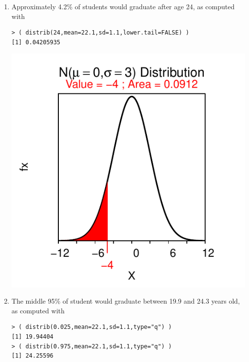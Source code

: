 \documentclass[10pt,openany]{book}\usepackage[]{graphicx}\usepackage[]{color}
\makeatletter
\newenvironment{kframe}{%
 \def\at@end@of@kframe{}%
 \ifinner\ifhmode%
  \def\at@end@of@kframe{\end{minipage}}%
  \begin{minipage}{\columnwidth}%
 \fi\fi%
 \def\FrameCommand##1{\hskip\@totalleftmargin \hskip-\fboxsep
 \colorbox{shadecolor}{##1}\hskip-\fboxsep
     \hskip-\linewidth \hskip-\@totalleftmargin \hskip\columnwidth}%
 \MakeFramed {\advance\hsize-\width
   \@totalleftmargin\z@ \linewidth\hsize
   \@setminipage}}%
 {\par\unskip\endMakeFramed%
 \at@end@of@kframe}
\newenvironment{knitrout}{}{} %
\makeatother
\begin{document}
\begin{itemize}
\begin{enumerate}
\begin{knitrout}
{}



\end{knitrout}
      \item Approximately 4.2\% of students would graduate after age 24, as computed with
\begin{knitrout}
\color{fgcolor}\begin{kframe}
\begin{verbatim}
> ( distrib(24,mean=22.1,sd=1.1,lower.tail=FALSE) )
[1] 0.04205935
\end{verbatim}
\end{kframe}

{\centering \includegraphics[width=.4\linewidth]{Figs/unnamed-chunk-233-1} 

}



\end{knitrout}
      \item The middle 95\% of student would graduate between 19.9 and 24.3 years old, as computed with
\begin{knitrout}
\color{fgcolor}\begin{kframe}
\begin{verbatim}
> ( distrib(0.025,mean=22.1,sd=1.1,type="q") )
[1] 19.94404
> ( distrib(0.975,mean=22.1,sd=1.1,type="q") )
[1] 24.25596
\end{verbatim}
\end{kframe}


\end{knitrout}
\end{enumerate}
\end{itemize}
\end{document}
